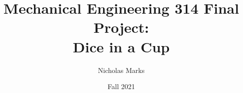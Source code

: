 

\title{Mechanical Engineering 314 Final Project:\\Dice in a Cup}
\author{Nicholas Marks}
\date{Fall 2021}


\pagestyle{plain}
\maketitle
\clearpage
{ %
\hypersetup{linkcolor=black}
    \tableofcontents
}
\clearpage






